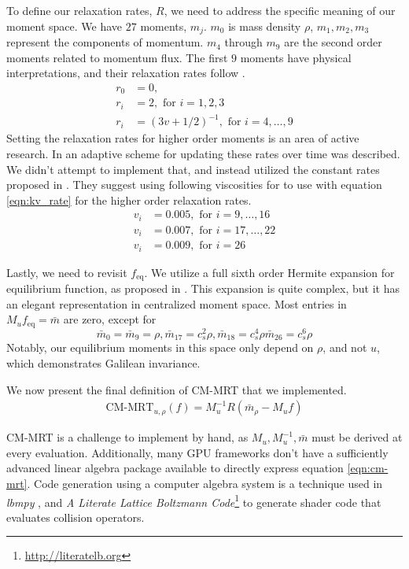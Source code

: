 To define our relaxation rates, $R$, we need to address
the specific meaning of our moment space.
We have $27$ moments, $m_j$.
$m_0$ is mass density $\rho$, 
$m_1, m_2, m_3$ represent the components of momentum.
$m_4$ through $m_9$ are the second order moments related
to momentum flux.
The first $9$ moments have physical interpretations,
and their relaxation rates follow \cite{Li2020, De2017}.
\begin{align}
  r_0 &= 0, \nonumber \\
  r_i &= 2, \text{ for } i = 1,2,3 \nonumber \\
  r_i &= (3v + 1 / 2)^{-1}, \text{ for } i = 4,\ldots, 9 \label{eqn:kv_rate}
\end{align}
Setting the relaxation rates for higher order moments 
is an area of active research.
In \cite{Li2020} an adaptive scheme for updating these rates
over time was described.
We didn't attempt to implement that, 
and instead utilized the constant rates proposed in \cite{Li2018}.
They suggest using following viscosities for
to use with equation \ref{eqn:kv_rate}
for the higher order relaxation rates. 
\begin{align*}
  v_i &= 0.005, \text{ for } i = 9,\ldots, 16 \\
  v_i &= 0.007, \text{ for } i = 17, \ldots, 22 \\
  v_i &= 0.009, \text{ for } i = 26 
\end{align*}

Lastly, we need to revisit $f_{\text{eq}}$.
We utilize a full sixth order Hermite expansion for 
equilibrium function, as proposed in \cite{Shan2006}.
This expansion is quite complex, but it has an elegant
representation in centralized moment space.
Most entries in $M_u f_{\text{eq}} = \bar{m}$ are zero, 
except for
$$
\bar{m}_0 = \bar{m}_9 = \rho, \bar{m}_{17} = c_s^2 \rho, \bar{m}_{18} = c_s^4\rho \bar{m}_{26} = c_s^6 \rho
$$
Notably, our equilibrium moments in this space only depend on $\rho$,
and not $u$, which demonstrates Galilean invariance.

We now present the final definition of CM-MRT that we implemented.
\begin{align}
  \text{CM-MRT}_{u,\rho}(f) = M_u^{-1} R (\bar{m}_{\rho} - M_u f) \label{eqn:cm-mrt}
\end{align}

CM-MRT is a challenge to implement by hand, 
as $M_u, M_u^{-1}, \bar{m}$ must be derived at every evaluation.
Additionally, many GPU frameworks
don't have a sufficiently advanced linear algebra package available
to directly express equation \ref{eqn:cm-mrt}.
Code generation using a computer algebra system is a technique used 
in \textit{lbmpy} \cite{Hennig2023}, 
and \textit{A Literate Lattice Boltzmann Code}\footnote{\url{http://literatelb.org}}
to generate shader code that
evaluates collision operators.

